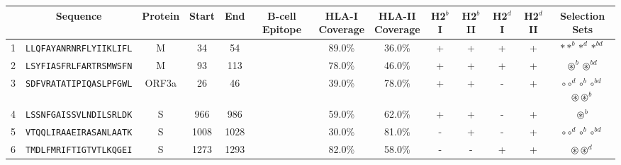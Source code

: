 \begin{tabular}{rcccccccccccc}
\toprule
{} &                        Sequence & Protein &  Start &   End & B-cell Epitope & \Centerstack{HLA-I \\ Coverage} & \Centerstack{HLA-II \\ Coverage} & H2$^{b}$ I & H2$^{b}$ II & H2$^{d}$ I & H2$^{d}$ II &                                                                                                   Selection Sets \\
\midrule
1  &  \texttt{LLQFAYANRNRFLYIIKLIFL} &       M &     34 &    54 &                &                          89.0\% &                           36.0\% &          + &           + &          + &           + &                                                                                 $ \ast \ast^b \ast^d \ast^{bd} $ \\
2  &  \texttt{LSYFIASFRLFARTRSMWSFN} &       M &     93 &   113 &                &                          78.0\% &                           46.0\% &          + &           + &          + &           + &                                                                               $ \circledast^b \circledast^{bd} $ \\
3  &  \texttt{SDFVRATATIPIQASLPFGWL} &   ORF3a &     26 &    46 &                &                          39.0\% &                           78.0\% &          + &           + &          - &           + &                              \Centerstack{  $\circ \circ^d \circ^b \circ^{bd}$ \\  $\circledast \circledast^b$ } \\
4  &  \texttt{LSSNFGAISSVLNDILSRLDK} &       S &    966 &   986 &                &                          59.0\% &                           62.0\% &          + &           + &          - &           + &                                                                                                $ \circledast^b $ \\
5  &  \texttt{VTQQLIRAAEIRASANLAATK} &       S &   1008 &  1028 &                &                          30.0\% &                           81.0\% &          - &           + &          - &           + &                                                                             $ \circ \circ^d \circ^b \circ^{bd} $ \\
6  &  \texttt{TMDLFMRIFTIGTVTLKQGEI} &       S &   1273 &  1293 &                &                          82.0\% &                           58.0\% &          - &           - &          + &           + &                                                                                    $ \circledast \circledast^d $ \\

\end{tabular}
